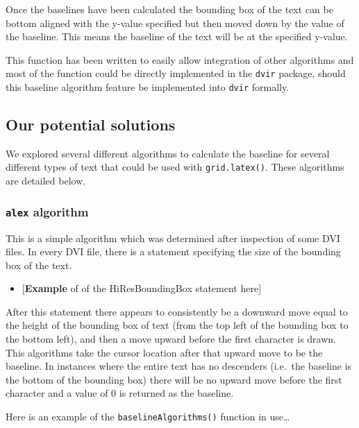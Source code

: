 \documentclass[]{article}
\newenvironment{Shaded}{\begin{snugshade}}{\end{snugshade}}
\newcommand{\KeywordTok}[1]{\textcolor[rgb]{0.13,0.29,0.53}{\textbf{#1}}}
\newcommand{\DataTypeTok}[1]{\textcolor[rgb]{0.13,0.29,0.53}{#1}}
\newcommand{\CharTok}[1]{\textcolor[rgb]{0.31,0.60,0.02}{#1}}
\newcommand{\StringTok}[1]{\textcolor[rgb]{0.31,0.60,0.02}{#1}}
\newcommand{\NormalTok}[1]{#1}
\providecommand{\tightlist}{%
  \setlength{\itemsep}{0pt}\setlength{\parskip}{0pt}}
\begin{document}
Once the baselines have been calculated the bounding box of the text can
be bottom aligned with the y-value specified but then moved down by the
value of the baseline. This means the baseline of the text will be at
the specified y-value.

This function has been written to easily allow integration of other
algorithms and most of the function could be directly implemented in the
\texttt{dvir} package, should this baseline algorithm feature be
implemented into \texttt{dvir} formally.

\subsection{Our potential solutions}\label{our-potential-solutions}

We explored several different algorithms to calculate the baseline for
several different types of text that could be used with
\texttt{grid.latex()}. These algorithms are detailed below.

\subsubsection{\texorpdfstring{\texttt{alex}
algorithm}{alex algorithm}}\label{alex-algorithm}

This is a simple algorithm which was determined after inspection of some
DVI files. In every DVI file, there is a statement specifying the size
of the bounding box of the text.

\begin{itemize}
\tightlist
\item
  {[}\textbf{Example} of of the HiResBoundingBox statement here{]}
\end{itemize}

After this statement there appears to consistently be a downward move
equal to the height of the bounding box of text (from the top left of
the bounding box to the bottom left), and then a move upward before the
first character is drawn. This algorithms take the cursor location after
that upward move to be the baseline. In instances where the entire text
has no descenders (i.e.~the baseline is the bottom of the bounding box)
there will be no upward move before the first character and a value of 0
is returned as the baseline.

Here is an example of the \texttt{baselineAlgorithms()} function in
use\ldots{}

\begin{Shaded}
\end{Shaded}
\end{document}
